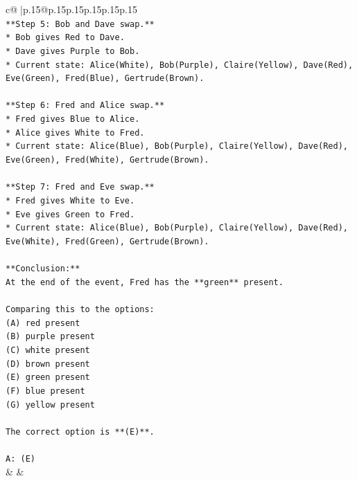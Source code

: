 \documentclass{article}
\begin{document}
{\begin{supertabular}{c@{$\;$}|p{.15\linewidth}@{}p{.15\linewidth}p{.15\linewidth}p{.15\linewidth}p{.15\linewidth}p{.15\linewidth}}
{{{\\ 
\texttt{**Step 5: Bob and Dave swap.**} \\
\texttt{*   Bob gives Red to Dave.} \\
\texttt{*   Dave gives Purple to Bob.} \\
\texttt{*   Current state: Alice(White), Bob(Purple), Claire(Yellow), Dave(Red), Eve(Green), Fred(Blue), Gertrude(Brown).} \\
\\ 
\texttt{**Step 6: Fred and Alice swap.**} \\
\texttt{*   Fred gives Blue to Alice.} \\
\texttt{*   Alice gives White to Fred.} \\
\texttt{*   Current state: Alice(Blue), Bob(Purple), Claire(Yellow), Dave(Red), Eve(Green), Fred(White), Gertrude(Brown).} \\
\\ 
\texttt{**Step 7: Fred and Eve swap.**} \\
\texttt{*   Fred gives White to Eve.} \\
\texttt{*   Eve gives Green to Fred.} \\
\texttt{*   Current state: Alice(Blue), Bob(Purple), Claire(Yellow), Dave(Red), Eve(White), Fred(Green), Gertrude(Brown).} \\
\\ 
\texttt{**Conclusion:**} \\
\texttt{At the end of the event, Fred has the **green** present.} \\
\\ 
\texttt{Comparing this to the options:} \\
\texttt{(A) red present} \\
\texttt{(B) purple present} \\
\texttt{(C) white present} \\
\texttt{(D) brown present} \\
\texttt{(E) green present} \\
\texttt{(F) blue present} \\
\texttt{(G) yellow present} \\
\\ 
\texttt{The correct option is **(E)**.} \\
\\ 
\texttt{A: (E)} \\
            }
        }
    }
    & & \\ \\


\end{supertabular}}
\end{document}
